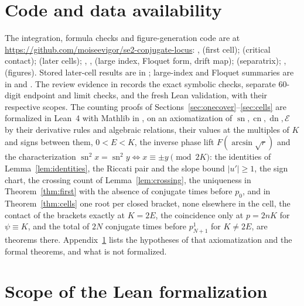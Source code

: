 \documentclass[11pt]{article}
\theoremstyle{remark}
\newcommand{\sn}{\operatorname{sn}}
\newcommand{\cn}{\operatorname{cn}}
\newcommand{\dn}{\operatorname{dn}}
\newcommand{\epsi}{\mathcal{E}}
\begin{document}
\section*{Code and data availability}

The integration, formula checks and figure-generation code are at \url{https://github.com/moiseevigor/se2-conjugate-locus}:
, 
(first cell);  (critical contact);
 (later cells);
, ,
 (large index, Floquet form, drift map);
 (separatrix);
,  (figures).
Stored later-cell results are in ;
large-index and Floquet summaries are in
 and .
The review evidence in 
records the exact symbolic checks, separate 60-digit endpoint and limit
checks, and the fresh Lean validation, with their respective scopes.
The counting proofs of Sections~\ref{sec:onecover}--\ref{sec:cells} are
formalized in Lean~4 with Mathlib in , on an axiomatization of
$\sn,\cn,\dn,\epsi$ by their derivative rules and algebraic relations,
their values at the multiples of $K$ and signs between them, $0<E<K$, the
inverse phase lift $F(\arcsin\sqrt r)$ and the characterization
$\sn^2x=\sn^2y\iff x\equiv\pm y\pmod{2K}$: the identities of
Lemma~\ref{lem:identities}, the Riccati pair and the slope bound
$|u'|\ge1$, the sign chart, the crossing count of Lemma~\ref{lem:crossing},
the uniqueness in Theorem~\ref{thm:first} with the absence of conjugate
times before $p_0$, and in Theorem~\ref{thm:cells} one root per closed
bracket, none elsewhere in the cell, the contact of the brackets exactly at
$K=2E$, the coincidence only at $p=2nK$ for $\psi\equiv K$, and the total
of $2N$ conjugate times before $p_{N+1}^1$ for $K\ne2E$, are theorems
there.  Appendix~\ref{app:lean} lists the hypotheses of that
axiomatization and the formal theorems, and what is not formalized.

\appendix
\section{Scope of the Lean formalization}\label{app:lean}
\end{document}
